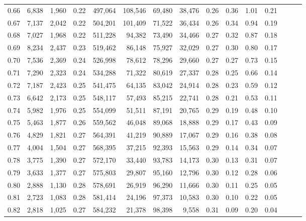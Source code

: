 \begin{tabular}{rrrrrrrrrrrrrrr}
0.66 &   6,838 &  1,960 &  0.22 &  497,064 &  108,546 &   69,480 &   38,476 &  0.26 &  0.36 &  1.01 &      0.21 \\
0.67 &   7,137 &  2,042 &  0.22 &  504,201 &  101,409 &   71,522 &   36,434 &  0.26 &  0.34 &  0.94 &      0.19 \\
0.68 &   7,027 &  1,968 &  0.22 &  511,228 &   94,382 &   73,490 &   34,466 &  0.27 &  0.32 &  0.87 &      0.18 \\
0.69 &   8,234 &  2,437 &  0.23 &  519,462 &   86,148 &   75,927 &   32,029 &  0.27 &  0.30 &  0.80 &      0.17 \\
0.70 &   7,536 &  2,369 &  0.24 &  526,998 &   78,612 &   78,296 &   29,660 &  0.27 &  0.27 &  0.73 &      0.15 \\
0.71 &   7,290 &  2,323 &  0.24 &  534,288 &   71,322 &   80,619 &   27,337 &  0.28 &  0.25 &  0.66 &      0.14 \\
0.72 &   7,187 &  2,423 &  0.25 &  541,475 &   64,135 &   83,042 &   24,914 &  0.28 &  0.23 &  0.59 &      0.12 \\
0.73 &   6,642 &  2,173 &  0.25 &  548,117 &   57,493 &   85,215 &   22,741 &  0.28 &  0.21 &  0.53 &      0.11 \\
0.74 &   5,982 &  1,976 &  0.25 &  554,099 &   51,511 &   87,191 &   20,765 &  0.29 &  0.19 &  0.48 &      0.10 \\
0.75 &   5,463 &  1,877 &  0.26 &  559,562 &   46,048 &   89,068 &   18,888 &  0.29 &  0.17 &  0.43 &      0.09 \\
0.76 &   4,829 &  1,821 &  0.27 &  564,391 &   41,219 &   90,889 &   17,067 &  0.29 &  0.16 &  0.38 &      0.08 \\
0.77 &   4,004 &  1,504 &  0.27 &  568,395 &   37,215 &   92,393 &   15,563 &  0.29 &  0.14 &  0.34 &      0.07 \\
0.78 &   3,775 &  1,390 &  0.27 &  572,170 &   33,440 &   93,783 &   14,173 &  0.30 &  0.13 &  0.31 &      0.07 \\
0.79 &   3,633 &  1,377 &  0.27 &  575,803 &   29,807 &   95,160 &   12,796 &  0.30 &  0.12 &  0.28 &      0.06 \\
0.80 &   2,888 &  1,130 &  0.28 &  578,691 &   26,919 &   96,290 &   11,666 &  0.30 &  0.11 &  0.25 &      0.05 \\
0.81 &   2,723 &  1,083 &  0.28 &  581,414 &   24,196 &   97,373 &   10,583 &  0.30 &  0.10 &  0.22 &      0.05 \\
0.82 &   2,818 &  1,025 &  0.27 &  584,232 &   21,378 &   98,398 &    9,558 &  0.31 &  0.09 &  0.20 &      0.04 \\

\end{tabular}
